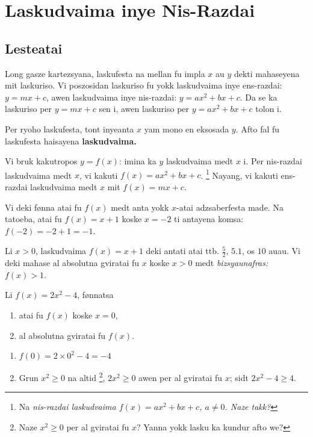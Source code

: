 \chapter{Laskudvaima inye Nis-Razdai}

\section{Lesteatai}

Long gasze kartezsyana, laskufesta na mellan fu impla \(x\) au \(y\) dekti mahaseyena mit laskuriso.
Vi poszosidan laskuriso fu yokk laskudvaima inye ens-razdai: \(y = mx + c\), awen laskudvaima inye
nis-razdai: \(y = ax^2 + bx + c\). Da se ka laskuriso per \(y = mx + c\) sen i, awen laskuriso per
\(y = ax^2 + bx + c\) tolon i.

Per ryoho laskufesta, tont inyeanta \(x\) yam mono en eksosada \(y\).
Afto fal fu laskufesta haisayena \bf{laskudvaima}.

Vi bruk kakutropos \(y = f\left(x\right)\): imina ka \(y\) laskudvaima medt \(x\) i.
Per nis-razdai laskudvaima medt \(x\), vi kakuti
\(f\left(x\right) = ax^2 + bx + c\). \footnote{Na \it{nis-razdai} laskudvaima \(f\left(x\right)=ax^2+bx+c\), \(a\neq0\). Naze takk?}
Nayang, vi kakuti ens-razdai laskudvaima medt \(x\) mit \(f\left(x\right) = mx + c\).

Vi deki fønna atai fu \(f\left(x\right)\) medt anta yokk \(x\)-atai adzsaberfesta made.
Na tatoeba, atai fu \(f\left(x\right) = x + 1\) koske \(x = -2\) ti antayena komsa: \(f\left(-2\right)=-2+1=-1\).

Li \(x > 0\), laskudvaima \(f\left(x\right) = x + 1\) deki antati atai ttb. \(\frac{5}{2}\), \(5.1\), os \(10\) auau.
Vi deki mahase al absolutna gviratai fu \(x\) koske \(x > 0\) medt \it{bizsyaunafras}: \(f\left(x\right) > 1\).

\begin{tatoeba}
  Li \(f\left(x\right)=2x^2-4\), fønnatsa
  \begin{enumerate}
    \item atai fu \(f\left(x\right)\) koske \(x=0\),
    \item al absolutna gviratai fu \(f\left(x\right)\).
  \end{enumerate}
\end{tatoeba}

  \begin{enumerate}
    \item \(f\left(0\right) = 2\times0^2 - 4 = -4\)
    \item Grun \(x^2\geq0\) na altid \footnote{Naze \(x^2\geq0\) per al gviratai fu \(x\)? Yanna yokk lasku ka kundur afto we?}, \(2x^2\geq0\) awen per al gviratai fu \(x\); sidt \(2x^2-4\geq4\).
  \end{enumerate}

